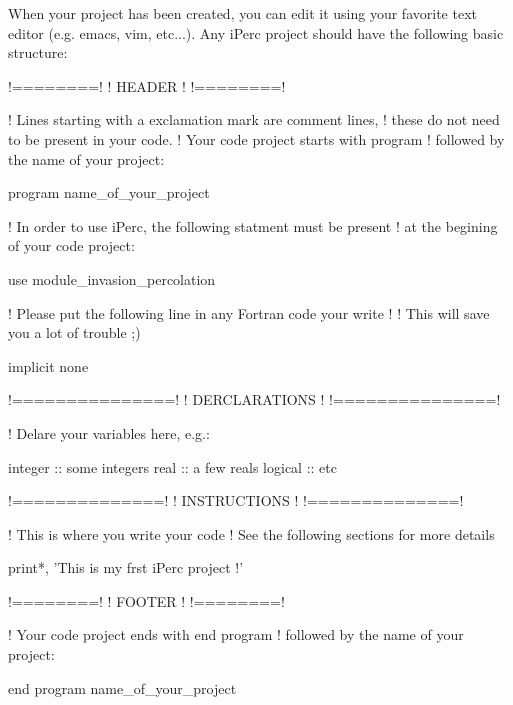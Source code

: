  \-When your project has been created, you can edit it using your favorite text editor (e.\-g. emacs, vim, etc...). \-Any i\-Perc project should have the following basic structure\-: 
\begin{DoxyCode}
 \textcolor{comment}{!========!}
 \textcolor{comment}{! HEADER !}
 \textcolor{comment}{!========!}

 \textcolor{comment}{! Lines starting with a exclamation mark are comment lines,}
 \textcolor{comment}{! these do not need to be present in your code.}
 \textcolor{comment}{! Your code project starts with program}
 \textcolor{comment}{! followed by the name of your project: }

 \textcolor{keyword}{program} name\_of\_your\_project

 \textcolor{comment}{! In order to use iPerc, the following statment must be present }
 \textcolor{comment}{! at the begining of your code project:}

 use \textcolor{keywordflow}{module\_invasion\_percolation}

 \textcolor{comment}{! Please put the following line in any Fortran code your write !}
 \textcolor{comment}{! This will save you a lot of trouble ;)}

 \textcolor{keyword}{implicit none}
 
 \textcolor{comment}{!===============!}
 \textcolor{comment}{! DERCLARATIONS !}
 \textcolor{comment}{!===============!}

 \textcolor{comment}{! Delare your variables here, e.g.:}

 \textcolor{keywordtype}{integer} :: some integers
 \textcolor{keywordtype}{real} :: a few reals
 \textcolor{keywordtype}{logical} :: etc

 \textcolor{comment}{!==============!}
 \textcolor{comment}{! INSTRUCTIONS !}
 \textcolor{comment}{!==============!}

 \textcolor{comment}{! This is where you write your code}
 \textcolor{comment}{! See the following sections for more details}
 
 print*, \textcolor{stringliteral}{'This is my frst iPerc project !'}

 \textcolor{comment}{!========!}
 \textcolor{comment}{! FOOTER !}
 \textcolor{comment}{!========!}

 \textcolor{comment}{! Your code project ends with end program}
 \textcolor{comment}{! followed by the name of your project: }

 \textcolor{keyword}{end} \textcolor{keyword}{program} name\_of\_your\_project
\end{DoxyCode}
